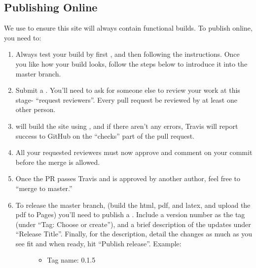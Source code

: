 \documentclass[letterpaper,10pt,english]{sphinxmanual}
\begin{document}
\subsection{Publishing Online}
\label{\detokenize{Textbook_Creation_Help/rst_intro:publishing-online}}\label{\detokenize{Textbook_Creation_Help/rst_intro:id3}}
We use  to ensure this site will always contain functional builds. To publish online, you need to:
\begin{enumerate}
\item {} 
Always test your build by first {\hyperref[\detokenize{Textbook_Creation_Help/rst_intro:building-rst-locally}]{}}, and then following the {\hyperref[\detokenize{Textbook_Creation_Help/rst_intro:testing-online}]{}} instructions. Once you like how your build looks, follow the steps below to introduce it into the master branch.

\item {} 
Submit a . You’ll need to ask for someone else to review your work at this stage- “request reviewers”. Every pull request  be reviewed by at least one other person.

\item {} 
 will build the site using , and if there aren’t any errors, Travis will report success to GitHub on the “checks” part of the pull request.

\item {} 
All your requested reviewers must now approve and comment on  your commit before the merge is allowed.

\item {} 
Once the PR passes Travis and is approved by another author, feel free to “merge to master.”

\item {} \begin{description}
\item[{To release the master branch, (build the html, pdf, and latex, and upload the pdf to Pages) you’ll need to publish a . Include a  version number as the tag (under “Tag: Choose or create”), and a brief description of the updates under “Release Title”. Finally, for the description, detail the changes as much as you see fit and when ready, hit “Publish release”. Example:}] \leavevmode\begin{itemize}
\item {} 
Tag name: 0.1.5


\end{itemize}
\end{description}
\end{enumerate}
\end{document}
